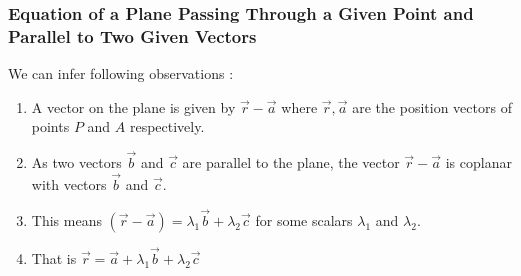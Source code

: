 \begin{frame}
\frametitle{Equation of a Plane Passing Through
a Given Point and Parallel to Two
Given Vectors}
We can infer following observations :
\begin{enumerate}
    \item A vector on the plane is given by \( \vec{r} - \vec{a} \) where \(\vec{r},\vec{a}\) are the position vectors of points \(P\) and \(A\) respectively.
    \item As two vectors \( \vec{b} \) and \( \vec{c} \) are parallel to the plane, the vector \( \vec{r} - \vec{a} \) is coplanar with vectors \( \vec{b} \) and \( \vec{c} \). 
    \item This means \((\vec{r} - \vec{a}) = \lambda_1 \vec{b} + \lambda_2 \vec{c}\) for some scalars \(\lambda_1\) and \(\lambda_2\).
    \item That is \(\vec{r} = \vec{a} + \lambda_1 \vec{b} + \lambda_2 \vec{c}\)
\end{enumerate}     
\end{frame}